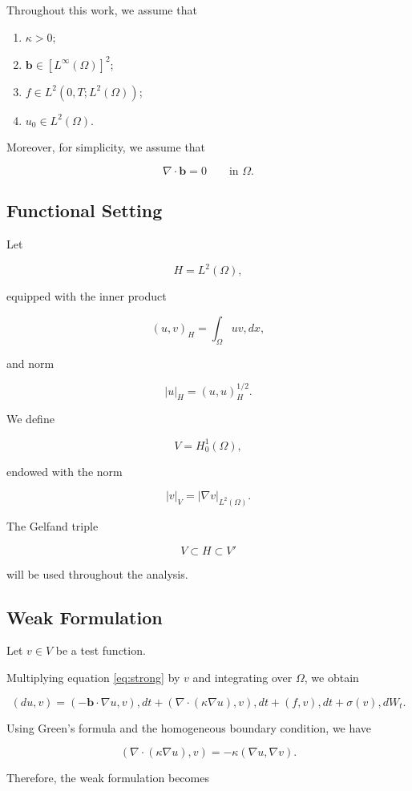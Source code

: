 Throughout this work, we assume that

\begin{enumerate}
\item $\kappa>0$;
\item $\mathbf b\in [L^\infty(\Omega)]^2$;
\item $f\in L^2(0,T;L^2(\Omega))$;
\item $u_0\in L^2(\Omega)$.
\end{enumerate}

Moreover, for simplicity, we assume that

\[
\nabla\cdot\mathbf b=0
\qquad \text{in } \Omega.
\]

\subsection{Functional Setting}

Let

\[
H=L^2(\Omega),
\]

equipped with the inner product

\[
(u,v)_H
=
\int_\Omega uv,dx,
\]

and norm

\[
|u|_H=(u,u)_H^{1/2}.
\]

We define

\[
V=H_0^1(\Omega),
\]

endowed with the norm

\[
|v|_V
=
|\nabla v|_{L^2(\Omega)}.
\]

The Gelfand triple

\[
V
\subset
H
\subset
V'
\]

will be used throughout the analysis.

\subsection{Weak Formulation}

Let $v\in V$ be a test function.

Multiplying equation \eqref{eq:strong} by $v$ and integrating over $\Omega$, we obtain

\[
(du,v)
=
(-\mathbf b\cdot\nabla u,v),dt
+
(\nabla\cdot(\kappa\nabla u),v),dt
+
(f,v),dt
+
\sigma(v),dW_t.
\]

Using Green's formula and the homogeneous boundary condition, we have

\[
(\nabla\cdot(\kappa\nabla u),v)
=
-\kappa(\nabla u,\nabla v).
\]

Therefore, the weak formulation becomes

